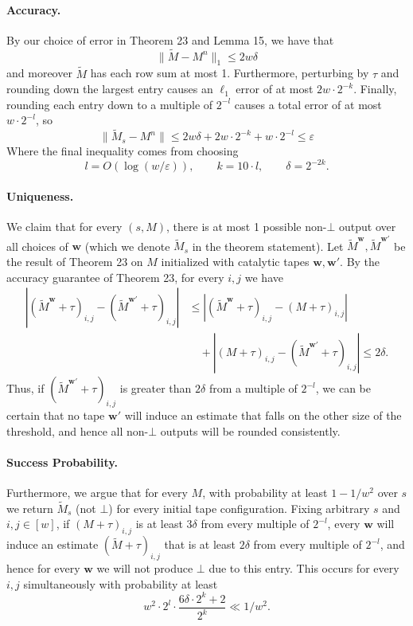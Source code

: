 \paragraph{Accuracy.} By our choice of error in Theorem 23 and Lemma 15, we have that
\[\|\widetilde M-M^n\|_1\leq2w\delta\]
and moreover $\widetilde M$ has each row sum at most 1. Furthermore, perturbing by $\tau$ and rounding down the largest entry causes an $\ell_1$ error of at most $2w\cdot2^{-k}$. Finally, rounding each entry down to a multiple of $2^{-l}$ causes a total error of at most $w\cdot2^{-l}$, so
\[\|\widetilde M_s-M^n\|\leq2w\delta+2w\cdot2^{-k}+w\cdot2^{-l}\leq\varepsilon\]
Where the final inequality comes from choosing
\[l=O(\log(w/\varepsilon)),\qquad k=10\cdot l,\qquad\delta=2^{-2k}.\]
\paragraph{Uniqueness.} We claim that for every $(s,M)$, there is at most 1 possible non-$\bot$ output over all choices of $\mathbf w$ (which we denote $\widetilde M_s$ in the theorem statement). Let $\widetilde M^{\mathbf w},\widetilde M^{\mathbf w'}$ be the result of Theorem 23 on $M$ initialized with catalytic tapes $\mathbf w,\mathbf w'$. By the accuracy guarantee of Theorem 23, for every $i,j$ we have
\begin{align*}
|(\widetilde M^{\mathbf w}+\tau)_{i,j}-(\widetilde M^{\mathbf w'}+\tau)_{i,j}|&\leq|(\widetilde M^{\mathbf w}+\tau)_{i,j}-(M+\tau)_{i,j}|\\
&\quad+|(M+\tau)_{i,j}-(\widetilde M^{\mathbf w'}+\tau)_{i,j}|\leq2\delta.
\end{align*}
Thus, if $(\widetilde M^{\mathbf w'}+\tau)_{i,j}$ is greater than $2\delta$ from a multiple of $2^{-l}$, we can be certain that no tape $\mathbf w'$ will induce an estimate that falls on the other size of the threshold, and hence all non-$\bot$ outputs will be rounded consistently.
\paragraph{Success Probability.} Furthermore, we argue that for every $M$, with probability at least $1-1/w^2$ over $s$ we return $\widetilde M_s$ (not $\bot$) for every initial tape configuration. Fixing arbitrary $s$ and $i,j\in[w]$, if $(M+\tau)_{i,j}$ is at least $3\delta$ from every multiple of $2^{-l}$, every $\mathbf w$ will induce an estimate $(\widetilde M+\tau)_{i,j}$ that is at least $2\delta$ from every multiple of $2^{-l}$, and hence for every $\mathbf w$ we will not produce $\bot$ due to this entry. This occurs for every $i,j$ simultaneously with probability at least
\[w^2\cdot2^l\cdot\frac{6\delta\cdot2^k+2}{2^k}\ll1/w^2.\]
